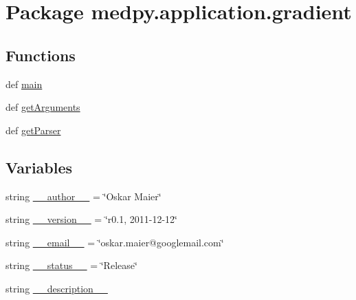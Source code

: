\hypertarget{namespacemedpy_1_1application_1_1gradient}{
\section{Package medpy.application.gradient}
\label{namespacemedpy_1_1application_1_1gradient}
}
\subsection*{Functions}
\begin{DoxyCompactItemize}
\item 
def \hyperlink{namespacemedpy_1_1application_1_1gradient_a95dba978d93b6adc4fe595986182d6ec}{main}
\item 
def \hyperlink{namespacemedpy_1_1application_1_1gradient_a0a2c93d1d12810a9653037b9a6928fd9}{getArguments}
\item 
def \hyperlink{namespacemedpy_1_1application_1_1gradient_acd9bd2e23c566151381fc136eab9f717}{getParser}
\end{DoxyCompactItemize}
\subsection*{Variables}
\begin{DoxyCompactItemize}
\item 
string \hyperlink{namespacemedpy_1_1application_1_1gradient_aa1d6344cd5a395d7e4d587483d436166}{\_\-\_\-author\_\-\_\-} = \char`\"{}Oskar Maier\char`\"{}
\item 
string \hyperlink{namespacemedpy_1_1application_1_1gradient_a10f82a37bc73425c1d34010f2e630184}{\_\-\_\-version\_\-\_\-} = \char`\"{}r0.1, 2011-\/12-\/12\char`\"{}
\item 
string \hyperlink{namespacemedpy_1_1application_1_1gradient_aac896da6093b760d4a08d353cd3f9ec5}{\_\-\_\-email\_\-\_\-} = \char`\"{}oskar.maier@googlemail.com\char`\"{}
\item 
string \hyperlink{namespacemedpy_1_1application_1_1gradient_af40fcbc5d5736dcdd259c38727bf4675}{\_\-\_\-status\_\-\_\-} = \char`\"{}Release\char`\"{}
\item 
string \hyperlink{namespacemedpy_1_1application_1_1gradient_a51b8dae829491ed7c627731fbff856a5}{\_\-\_\-description\_\-\_\-}
\end{DoxyCompactItemize}


